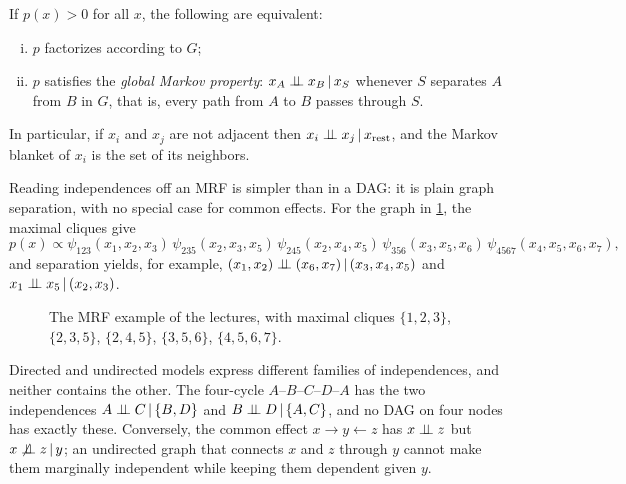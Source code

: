 \begin{theorem}\label{thm:hammersley-clifford}
If $p(x)>0$ for all $x$, the following are equivalent:
\begin{enumerate}[(i)]
  \item $p$ factorizes according to $G$;
  \item $p$ satisfies the \emph{global Markov property}: $x_A\perp\!\!\!\perp x_B\,|\, x_S$ whenever $S$ separates $A$ from $B$ in $G$, that is, every path from $A$ to $B$ passes through $S$.
\end{enumerate}
In particular, if $x_i$ and $x_j$ are not adjacent then $x_i\perp\!\!\!\perp x_j\,|\, x_{\text{rest}}$, and the Markov blanket of $x_i$ is the set of its neighbors.
\end{theorem}

Reading independences off an MRF is simpler than in a DAG: it is plain graph separation, with no special case for common effects. For the graph in \cref{fig:mrf7}, the maximal cliques give
\[
p(x)\propto\psi_{123}(x_1,x_2,x_3)\,\psi_{235}(x_2,x_3,x_5)\,\psi_{245}(x_2,x_4,x_5)\,\psi_{356}(x_3,x_5,x_6)\,\psi_{4567}(x_4,x_5,x_6,x_7),
\]
and separation yields, for example, $(x_1,x_2)\perp\!\!\!\perp(x_6,x_7)\,|\,(x_3,x_4,x_5)$ and $x_1\perp\!\!\!\perp x_5\,|\,(x_2,x_3)$.

\begin{figure}[ht]
\centering
{}
\caption{The MRF example of the lectures, with maximal cliques $\{1,2,3\}$, $\{2,3,5\}$, $\{2,4,5\}$, $\{3,5,6\}$, $\{4,5,6,7\}$.}
\label{fig:mrf7}
\end{figure}

Directed and undirected models express different families of independences, and neither contains the other. The four-cycle $A\text{--}B\text{--}C\text{--}D\text{--}A$ has the two independences $A\perp\!\!\!\perp C\,|\,\{B,D\}$ and $B\perp\!\!\!\perp D\,|\,\{A,C\}$, and no DAG on four nodes has exactly these. Conversely, the common effect $x\to y\leftarrow z$ has $x\perp\!\!\!\perp z$ but $x\not\perp\!\!\!\perp z\,|\, y$; an undirected graph that connects $x$ and $z$ through $y$ cannot make them marginally independent while keeping them dependent given $y$.


